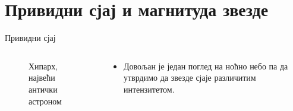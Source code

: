 \documentclass[aspectratio=169, xcolor=table, 10pt]{beamer}
\begin{document}
\section{Привидни сјај и магнитуда звезде }

\begin{frame}{Привидни сјај}
  \begin{columns}[T]
    \begin{column}{0.35\textwidth}
      \begin{figure}
        \centering
        \captionsetup{width=\wd0}
        \caption{Хипарх, највећи антички астроном}
      \end{figure}
    \end{column}
    \begin{column}{0.65\textwidth}
      \begin{itemize}
        \item Довољан је један поглед на ноћно небо па да утврдимо да звезде сјаје различитим интензитетом.

\end{itemize}
\end{column}
\end{columns}
\end{frame}
\end{document}
